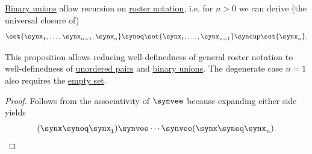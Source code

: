 \begin{proposition}\label{thm:roster_notation_via_pairs}
  \hyperref[def:set_union/binary]{Binary unions} allow recursion on \hyperref[def:set_theory_definition/roster]{roster notation}, i.e. for \( n > 0 \) we can derive (the universal closure of)
  \begin{equation*}
    \set{ \synx_1, \ldots, \synx_{n-1}, \synx_n } \syneq \set{ \synx_1, \ldots, \synx_{n-1} } \syncup \set{ \synx_n }.
  \end{equation*}
\end{proposition}
\begin{comments}
  \item This proposition allows reducing well-definedness of general roster notation to well-definedness of \hyperref[def:unordered_pair]{unordered pairs} and \hyperref[def:set_union]{binary unions}. The degenerate case \( n = 1 \) also requires the \hyperref[def:empty_set]{empty set}.
\end{comments}
\begin{proof}
  Follows from the associativity of \( \synvee \) because expanding either side yields
  \begin{equation*}
    (\synx \syneq \synx_1) \synvee \cdots \synvee (\synx \syneq \synx_n).
  \end{equation*}
\end{proof}

